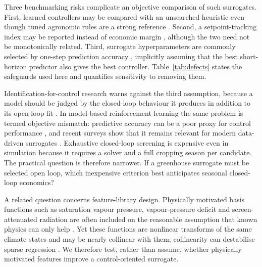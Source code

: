 Three benchmarking risks complicate an objective comparison of such surrogates. First,
learned controllers may be compared with an unsearched heuristic even though tuned
agronomic rules are a strong reference \cite{morcego2023,mallick2025,vanlaatum2025}.
Second, a setpoint-tracking index may be reported instead of economic margin
\cite{lin2021,morcego2023}, although the two need not be monotonically related. Third,
surrogate hyperparameters are commonly selected by one-step prediction accuracy
\cite{kaiser2018,yonezawa2026}, implicitly assuming that the best short-horizon predictor
also gives the best controller. Table~\ref{tab:defects} states the safeguards used here
and quantifies sensitivity to removing them.

Identification-for-control research warns against the third assumption, because a model
should be judged by the closed-loop behaviour it produces in addition to its open-loop fit
\cite{ljung1999,gevers1993,vandenhof1995}. In model-based reinforcement learning the same
problem is termed objective mismatch: predictive accuracy can be a poor proxy for
control performance \cite{lambert2020,jackson2022,farahmand2017}, and recent surveys show
that it remains relevant for modern data-driven surrogates
\cite{wei2024,controlorientedsurvey2025}. Exhaustive closed-loop screening is expensive
even in simulation because it requires a solver and a full cropping season per candidate.
The practical question is therefore narrower. If a greenhouse surrogate must be selected
open loop, which inexpensive criterion best anticipates seasonal closed-loop economics?

A related question concerns feature-library design. Physically motivated basis functions
such as saturation vapour pressure, vapour-pressure deficit and screen-attenuated
radiation are often included on the reasonable assumption that known physics can only
help \cite{raissi2019,karniadakis2021}. Yet these functions are nonlinear transforms of
the same climate states and may be nearly collinear with them; collinearity can destabilise
sparse regression \cite{cortiella2021,balanceguided2026}. We therefore test, rather than
assume, whether physically motivated features improve a control-oriented surrogate.

